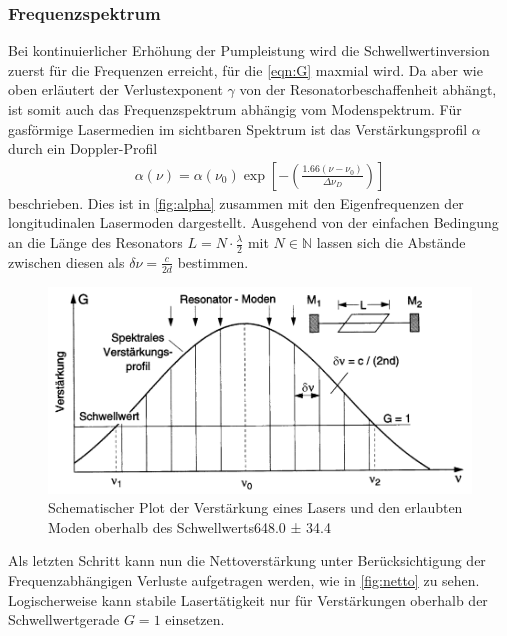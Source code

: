 \subsubsection{Frequenzspektrum}
Bei kontinuierlicher Erhöhung der Pumpleistung wird die Schwellwertinversion zuerst für die Frequenzen erreicht, für die \autoref{eqn:G} maxmial wird.
Da aber wie oben erläutert der Verlustexponent $\gamma$ von der Resonatorbeschaffenheit abhängt, ist somit auch das Frequenzspektrum abhängig vom Modenspektrum.
Für gasförmige Lasermedien im sichtbaren Spektrum ist das Verstärkungsprofil $\alpha$ durch ein Doppler-Profil 
\begin{align}
    \alpha(\nu)=\alpha(\nu_0)\exp{\left[-\left(\frac{1.66(\nu-\nu_0)}{\Delta\nu_D}\right)\right]}
\end{align}
beschrieben. Dies ist in \autoref{fig:alpha} zusammen mit den Eigenfrequenzen der longitudinalen Lasermoden dargestellt. Ausgehend von der einfachen Bedingung an die Länge des Resonators $L = N\cdot\frac{\lambda}{2}$ mit $N\in\mathbb{N}$ lassen sich die Abstände zwischen diesen als $\delta\nu=\frac{c}{2d}$ bestimmen.
\begin{figure}[H]
    \centering
    \includegraphics[scale=0.5]{Ressourcen/alpha.png}
    \caption{Schematischer Plot der Verstärkung eines Lasers und den erlaubten Moden oberhalb des Schwellwerts648.0 ± 34.4}\label{fig:alpha}
\end{figure}
Als letzten Schritt kann nun die Nettoverstärkung unter Berücksichtigung der Frequenzabhängigen Verluste aufgetragen werden, wie in \autoref{fig:netto} zu sehen. Logischerweise kann stabile Lasertätigkeit nur für Verstärkungen oberhalb der Schwellwertgerade $G=1$ einsetzen.

